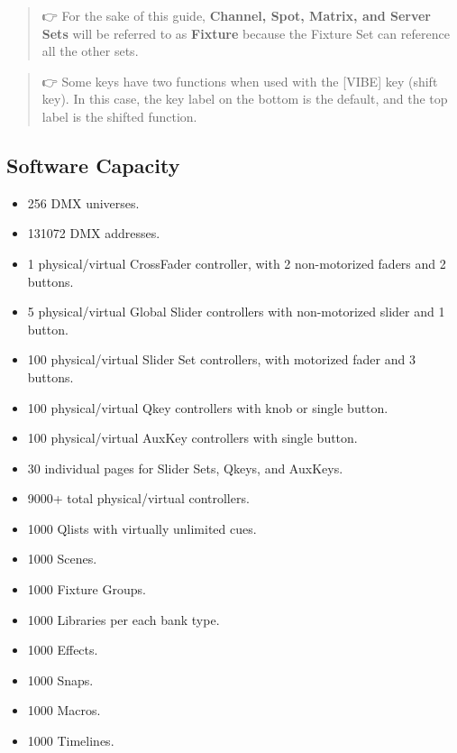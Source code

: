\documentclass[
]{article}
\begin{document}
\begin{quote}
👉 For the sake of this guide, \textbf{Channel, Spot, Matrix, and Server Sets} will be referred to as \textbf{Fixture} because the Fixture Set can reference all the other sets.
\end{quote}

\begin{quote}
👉 Some keys have two functions when used with the {[}VIBE{]} key (shift key). In this case, the key label on the bottom is the default, and the top label is the shifted function.
\end{quote}

\hypertarget{Software-Capacity-1.4}{%
\subsection{Software Capacity}\label{Software-Capacity-1.4}}

\begin{itemize}
\item
  256 DMX universes.
\item
  131072 DMX addresses.
\item
  1 physical/virtual CrossFader controller, with 2 non-motorized faders and 2 buttons.
\item
  5 physical/virtual Global Slider controllers with non-motorized slider and 1 button.
\item
  100 physical/virtual Slider Set controllers, with motorized fader and 3 buttons.
\item
  100 physical/virtual Qkey controllers with knob or single button.
\item
  100 physical/virtual AuxKey controllers with single button.
\item
  30 individual pages for Slider Sets, Qkeys, and AuxKeys.
\item
  9000+ total physical/virtual controllers.
\item
  1000 Qlists with virtually unlimited cues.
\item
  1000 Scenes.
\item
  1000 Fixture Groups.
\item
  1000 Libraries per each bank type.
\item
  1000 Effects.
\item
  1000 Snaps.
\item
  1000 Macros.
\item
  1000 Timelines.
\end{itemize}
\end{document}
